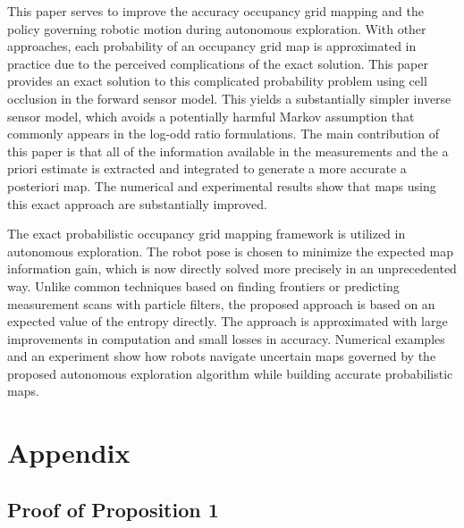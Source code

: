 \documentclass[smallextended]{svjour3}       %
\begin{document}
This paper serves to improve the accuracy occupancy grid mapping and the policy governing robotic motion during autonomous exploration.
With other approaches, each probability of an occupancy grid map is approximated in practice due to the perceived complications of the exact solution.
This paper provides an exact solution to this complicated probability problem using cell occlusion in the forward sensor model. This yields a substantially simpler inverse sensor model, which avoids a potentially harmful Markov assumption that commonly appears in the log-odd ratio formulations. The main contribution of this paper is that all of the information available in the measurements and the a priori estimate is extracted and integrated to generate a more accurate a posteriori map. The numerical and experimental results show that maps using this exact approach are substantially improved. 

The exact probabilistic occupancy grid mapping framework is utilized in autonomous exploration. The robot pose is chosen to minimize the expected map information gain, which is now directly solved more precisely in an unprecedented way. Unlike common techniques based on finding frontiers or predicting measurement scans with particle filters, the proposed approach is based on an expected value of the entropy directly. The approach is approximated with large improvements in computation and small losses in accuracy. Numerical examples and an experiment show how robots navigate uncertain maps governed by the proposed autonomous exploration algorithm while building accurate probabilistic maps.














\section*{Appendix}\label{append}


\subsection*{Proof of Proposition 1}
\end{document}
